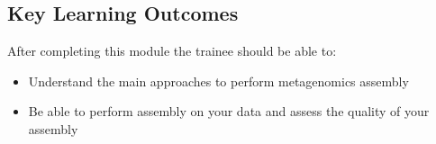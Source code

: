 
\chapter{\moduleTitle}
\newpage


% 
\section{Key Learning Outcomes}

After completing this module the trainee should be able to:
\begin{itemize}
  \item Understand the main approaches to perform metagenomics assembly
  \item Be able to perform assembly on your data and assess the quality of your assembly
\end{itemize}

